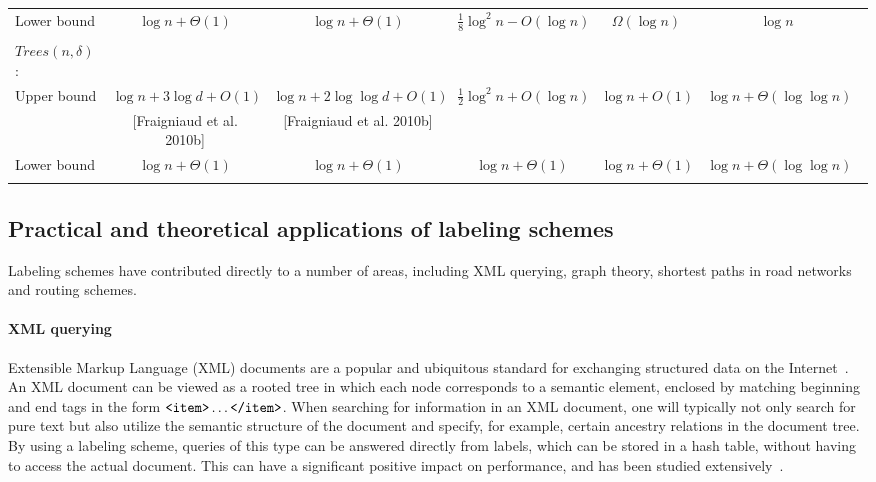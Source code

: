 \begin{table}[!ht]
{\begin{tabular}{lcccccc}
Lower bound &$\log n + \Theta(1)$ &$\log n + \Theta(1)$ &$\frac{1}{8}\log^2 n-O(\log n)$  &$ \Omega(\log n)$	&$\log n$	\\ 
&&&\cite{Gavoille2001}&\cite{Alstrup02NCA} \\
\hline 
			
$Trees(n,\delta)$:\\
Upper bound & $\log n + 3 \log d +O(1)$ &$\log n +2 \log \log d +O(1) $ &$\frac{1}{2}\log^2 n +O(\log n)$ 	&$\log n +O(1)$ 	&$\log n+ \Theta(\log \log n)$\\ 
& [Fraigniaud et al. 2010b] &[Fraigniaud et al. 2010b]	&&& \cite{Alstrup05}\\	\hdashline				

Lower  bound & $\log n + \Theta(1)$	&$\log n + \Theta(1)$  &$\log n + \Theta(1)$  &$\log n + \Theta(1)$  &$\log n + \Theta(\log \log n) $  \\ 
&&&&& \\ \hline						
  \end{tabular}}\label{table:bounded}
\end{table}



						
\subsection{Practical and theoretical applications of labeling schemes}\label{section:applications}
Labeling schemes have  contributed directly to a number of areas, including XML querying, graph theory, shortest paths in road networks and routing schemes.

\paragraph{XML querying}  
 Extensible Markup Language (XML) documents are a popular and ubiquitous standard for exchanging structured data on the Internet~\cite{Kaplan01}. An XML document can be viewed as a rooted tree in which each node corresponds to a semantic element, enclosed by matching beginning and end tags in the form $\verb+<item>+\dots\verb+</item>+$. When searching for information in an XML document, one will typically not only search for pure text but also utilize the semantic structure of the document and specify, for example, certain ancestry relations in the document tree. By using a labeling scheme, queries of this type can be answered directly from labels, which can be stored in a hash table, without having to access the actual document. 
 This can have a significant positive impact on performance, and has been studied extensively~\cite{Cohen02,lu2013xml,harder2007node,Kaplan01,wu2004prime,cohen10journal}.

